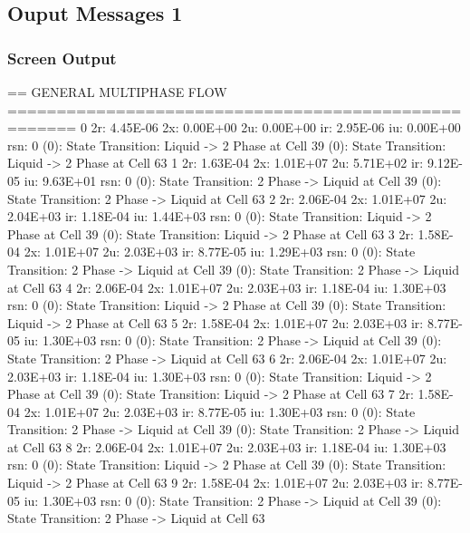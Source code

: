 \documentclass{beamer}
\begin{document}
\subsection{Ouput Messages 1}

\begin{frame}[fragile]\frametitle{Screen Output}

\begin{semiverbatim}
\tiny
== GENERAL MULTIPHASE FLOW =====================================================
  0 2r: 4.45E-06 2x: 0.00E+00 2u: 0.00E+00 ir: 2.95E-06 iu: 0.00E+00 rsn:   0
 (0): State Transition: Liquid -> 2 Phase at Cell       39
 (0): State Transition: Liquid -> 2 Phase at Cell       63
  1 2r: 1.63E-04 2x: 1.01E+07 2u: 5.71E+02 ir: 9.12E-05 iu: 9.63E+01 rsn:   0
 (0): State Transition: 2 Phase -> Liquid at Cell       39
 (0): State Transition: 2 Phase -> Liquid at Cell       63
  2 2r: 2.06E-04 2x: 1.01E+07 2u: 2.04E+03 ir: 1.18E-04 iu: 1.44E+03 rsn:   0
 (0): State Transition: Liquid -> 2 Phase at Cell       39
 (0): State Transition: Liquid -> 2 Phase at Cell       63
  3 2r: 1.58E-04 2x: 1.01E+07 2u: 2.03E+03 ir: 8.77E-05 iu: 1.29E+03 rsn:   0
 (0): State Transition: 2 Phase -> Liquid at Cell       39
 (0): State Transition: 2 Phase -> Liquid at Cell       63
  4 2r: 2.06E-04 2x: 1.01E+07 2u: 2.03E+03 ir: 1.18E-04 iu: 1.30E+03 rsn:   0
 (0): State Transition: Liquid -> 2 Phase at Cell       39
 (0): State Transition: Liquid -> 2 Phase at Cell       63
  5 2r: 1.58E-04 2x: 1.01E+07 2u: 2.03E+03 ir: 8.77E-05 iu: 1.30E+03 rsn:   0
 (0): State Transition: 2 Phase -> Liquid at Cell       39
 (0): State Transition: 2 Phase -> Liquid at Cell       63
  6 2r: 2.06E-04 2x: 1.01E+07 2u: 2.03E+03 ir: 1.18E-04 iu: 1.30E+03 rsn:   0
 (0): State Transition: Liquid -> 2 Phase at Cell       39
 (0): State Transition: Liquid -> 2 Phase at Cell       63
  7 2r: 1.58E-04 2x: 1.01E+07 2u: 2.03E+03 ir: 8.77E-05 iu: 1.30E+03 rsn:   0
 (0): State Transition: 2 Phase -> Liquid at Cell       39
 (0): State Transition: 2 Phase -> Liquid at Cell       63
  8 2r: 2.06E-04 2x: 1.01E+07 2u: 2.03E+03 ir: 1.18E-04 iu: 1.30E+03 rsn:   0
 (0): State Transition: Liquid -> 2 Phase at Cell       39
 (0): State Transition: Liquid -> 2 Phase at Cell       63
  9 2r: 1.58E-04 2x: 1.01E+07 2u: 2.03E+03 ir: 8.77E-05 iu: 1.30E+03 rsn:   0
 (0): State Transition: 2 Phase -> Liquid at Cell       39
 (0): State Transition: 2 Phase -> Liquid at Cell       63

\end{semiverbatim}


\end{frame}
\end{document}
